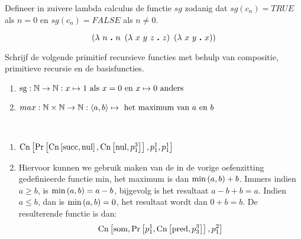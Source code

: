 \documentclass[a4paper]{article}
\newcommand{\prnul}[0]{\ensuremath{\mbox{nul}}}
\newcommand{\prsucc}[0]{\ensuremath{\mbox{succ}}}
\newcommand{\prp}[2]{\ensuremath{p_{#2}^{#1}}}
\newcommand{\prcn}[2]{\funmf{Cn}{#1,#2}}
\newcommand{\prpr}[2]{\funmf{Pr}{#1,#2}}
\begin{document}
\begin{question}
Defineer in zuivere lambda calculus de functie $sg$ zodanig dat $sg(c_n) = TRUE$ als $n = 0$ en $sg(c_n) = FALSE$ als $n \neq 0$.
\begin{answer}
\begin{equation}
\lambdacal{n}{n\ \lambdacal{x\ y\ z}{z}\ \lambdacal{x\ y}{x}}
\end{equation}
\end{answer}
\end{question}

\begin{question}
Schrijf de volgende primitief recursieve functies met behulp van compositie, primitieve recursie en de basisfuncties.
\begin{enumerate}
  \item $\mbox{sg}:\mathbb{N}\to\mathbb{N}:x\mapsto1\text{ als $x = 0$ en $x \mapsto 0$ anders}$
  \item $max:\mathbb{N} \times \mathbb{N}\to\mathbb{N}:\left\langle a,b \right\rangle\mapsto\text{ het maximum van $a$ en $b$}$
\end{enumerate}
\begin{answer}~~
\begin{enumerate}
 \item $\prcn{\prpr{\prcn{\prsucc}{\prnul}}{\prcn{\prnul}{\prp31}}}{\prp11,\prp11}$
 \item Hiervoor kunnen we gebruik maken van de in de vorige oefenzitting gedefinieerde functie $\mbox{min}$, het maximum is dan $\mbox{min}\left( a,b \right)+b$. Immers indien $a\geq b$, is $\mbox{min}\left( a,b \right)=a-b$, bijgevolg is het resultaat $a-b+b=a$. Indien $a\leq b$, dan is $\mbox{min}\left( a,b \right)=0$, het resultaat wordt dan $0+b=b$. De resulterende functie is dan:
 \begin{equation}
  \prcn{\mbox{som}}{\prpr{\prp{1}{1}}{\prcn{\mbox{pred}}{\prp{3}{3}}},\prp21}
 \end{equation}
\end{enumerate}
\end{answer}
\end{question}
\end{document}
